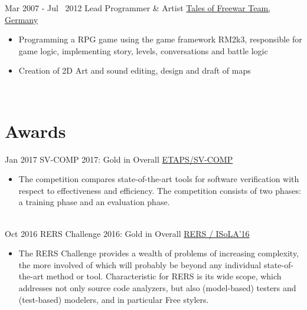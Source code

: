 \documentclass[letterpaper]{twentysecondcv} %
\begin{document}
\begin{twenty}
	\twentyitem
    		{Mar 2007 -}
		{Jul~ 2012}
        		{Lead Programmer \& Artist}
        		{\href{https://github.com/ZabuzaW/TalesOfFreewar}{Tales of Freewar Team, Germany}}
        		{}
        		{\begin{itemize}
        			\item Programming a RPG game using the game framework RM2k3, responsible for game logic,
        				implementing story, levels, conversations and battle logic
        			\item Creation of 2D Art and sound editing, design and draft of maps
        		\end{itemize}}\\
\end{twenty}


\section{Awards}
\begin{twenty} %
	\twentyitem
    		{Jan 2017}
		{}
        		{SV-COMP 2017: Gold in Overall}
        		{\href{https://sv-comp.sosy-lab.org/2017/}{ETAPS/SV-COMP}}
        		{}
        		{\begin{itemize}
        			\item The competition compares state-of-the-art tools for software verification with respect to effectiveness
        				and efficiency. The competition consists of two phases: a training phase and an evaluation phase.
        		\end{itemize}}\\
        	\twentyitem
    		{Oct 2016}
		{}
        		{RERS Challenge 2016: Gold in Overall}
        		{\href{http://rers-challenge.org/2016/}{RERS / ISoLA'16}}
        		{}
        		{\begin{itemize}
        			\item The RERS Challenge provides a wealth of problems of increasing complexity, the more involved of
        				which will probably be beyond any individual state-of-the-art method or tool. Characteristic for RERS
        				is its wide scope, which addresses not only source code analyzers, but also (model-based) testers
        				and (test-based) modelers, and in particular Free stylers.
        		\end{itemize}}\\
\end{twenty}
\end{document}
